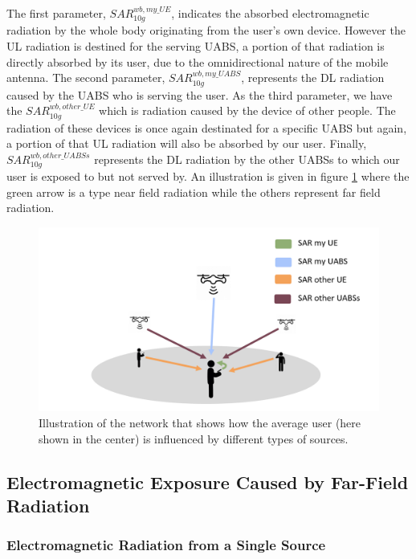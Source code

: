 \documentclass[twocolumn]{phdsymp} %
\begin{document}
The first parameter, $SAR^{wb,my\_UE}_{10g}$, indicates the absorbed electromagnetic radiation by the whole body originating from the user's own device.
 However the 
\gls{UL} radiation is destined for the serving \gls{UABS}, a portion of that radiation is directly absorbed by its user, due to the omnidirectional nature of the mobile 
antenna.
The second parameter, $SAR^{wb,my\_UABS}_{10g}$, represents the \gls{DL} radiation caused by the \gls{UABS} who is serving the user.
As the third parameter, we have the $SAR^{wb,other\_UE}_{10g}$ which is radiation caused by the device of other people. The radiation of these devices is once again 
destinated for a specific \gls{UABS} but again, a portion of that \gls{UL} radiation will also be absorbed by our user.
Finally, $SAR^{wb,other\_UABSs}_{10g}$ represents the \gls{DL} radiation by the other UABSs to which our user is exposed to but not served by.
An illustration is given in figure \ref{fig:networkIllustration} where the green arrow is a type near field radiation while 
the others represent far field radiation.

\begin{figure}[h!]
\centering
  \includegraphics[width=\linewidth]{networkIllustrationSARSources.png}
  \caption{Illustration of the network that shows how the average user (here shown in the center) is influenced by different types of sources. }
  \label{fig:networkIllustration}
\end{figure}

\subsection{Electromagnetic Exposure Caused by Far-Field Radiation} %
\label{sub:Calculatingdownlinkexposure}

\subsubsection{Electromagnetic Radiation from a Single Source}
\label{sec:calculatingexposure}
\end{document}
